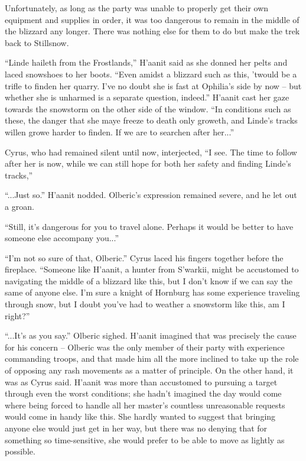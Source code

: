 Unfortunately, as long as the party was unable to properly get their own equipment and supplies in order, it was too dangerous to remain in the middle of the blizzard any longer. There was nothing else for them to do but make the trek back to Stillsnow.

``Linde haileth from the Frostlands,'' H'aanit said as she donned her pelts and laced snowshoes to her boots. ``Even amidst a blizzard such as this, 'twould be a trifle to finden her quarry. I've no doubt she is fast at Ophilia's side by now -- but whether she is unharmed is a separate question, indeed.'' H'aanit cast her gaze towards the snowstorm on the other side of the window. ``In conditions such as these, the danger that she maye freeze to death only groweth, and Linde's tracks willen growe harder to finden. If we are to searchen after her...''

Cyrus, who had remained silent until now, interjected, ``I see. The time to follow after her is now, while we can still hope for both her safety and finding Linde's tracks,''

``...Just so.'' H'aanit nodded. Olberic's expression remained severe, and he let out a groan.

``Still, it's dangerous for you to travel alone. Perhaps it would be better to have someone else accompany you...''

``I'm not so sure of that, Olberic.'' Cyrus laced his fingers together before the fireplace. ``Someone like H'aanit, a hunter from S'warkii, might be accustomed to navigating the middle of a blizzard like this, but I don't know if we can say the same of anyone else. I'm sure a knight of Hornburg has some experience traveling through snow, but I doubt you've had to weather a snowstorm like this, am I right?''

``...It's as you say.'' Olberic sighed. H'aanit imagined that was precisely the cause for his concern -- Olberic was the only member of their party with experience commanding troops, and that made him all the more inclined to take up the role of opposing any rash movements as a matter of principle.  On the other hand, it was as Cyrus said. H'aanit was more than accustomed to pursuing a target through even the worst conditions; she hadn't imagined the day would come where being forced to handle all her master's countless unreasonable requests would come in handy like this. She hardly wanted to suggest that bringing anyone else would just get in her way, but there was no denying that for something so time-sensitive, she would prefer to be able to move as lightly as possible.

